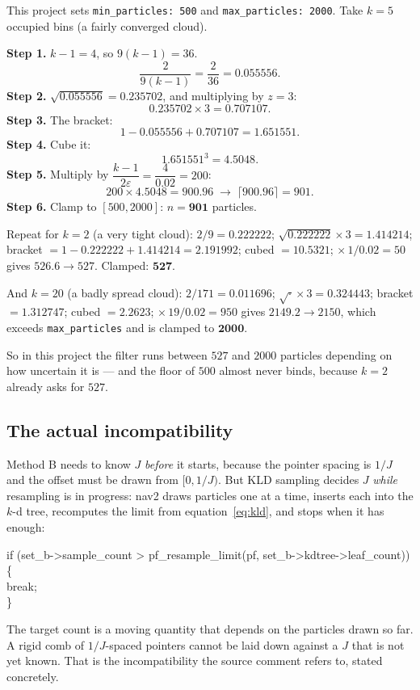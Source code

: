 \documentclass[11pt,a4paper]{report}
\newcommand{\file}[1]{\texttt{\small #1}}
\begin{document}
\begin{handbox}
This project sets \file{min\_particles: 500} and \file{max\_particles: 2000}.
Take $k = 5$ occupied bins (a fairly converged cloud).

\smallskip
\textbf{Step 1.} $k - 1 = 4$, so $9(k-1) = 36$.
\[
\frac{2}{9(k-1)} = \frac{2}{36} = 0.055556 .
\]
\textbf{Step 2.} $\sqrt{0.055556} = 0.235702$, and multiplying by $z = 3$:
\[
0.235702 \times 3 = 0.707107 .
\]
\textbf{Step 3.} The bracket:
\[
1 - 0.055556 + 0.707107 = 1.651551 .
\]
\textbf{Step 4.} Cube it:
\[
1.651551^{3} = 4.5048 .
\]
\textbf{Step 5.} Multiply by $\dfrac{k-1}{2\varepsilon} = \dfrac{4}{0.02} = 200$:
\[
200 \times 4.5048 = 900.96 \;\longrightarrow\; \lceil 900.96 \rceil = 901 .
\]
\textbf{Step 6.} Clamp to $[500, 2000]$: $n = \mathbf{901}$ particles.

\medskip
Repeat for $k = 2$ (a very tight cloud):
$2/9 = 0.222222$; $\sqrt{0.222222}\times 3 = 1.414214$;
bracket $= 1 - 0.222222 + 1.414214 = 2.191992$; cubed $= 10.5321$;
$\times\, 1/0.02 = 50$ gives $526.6 \rightarrow 527$. Clamped: $\mathbf{527}$.

\medskip
And $k = 20$ (a badly spread cloud):
$2/171 = 0.011696$; $\sqrt{\cdot}\times 3 = 0.324443$; bracket $= 1.312747$;
cubed $= 2.2623$; $\times\, 19/0.02 = 950$ gives $2149.2 \rightarrow 2150$,
which exceeds \file{max\_particles} and is clamped to $\mathbf{2000}$.

\medskip
So in this project the filter runs between $527$ and $2000$ particles
depending on how uncertain it is --- and the floor of $500$ almost never binds,
because $k = 2$ already asks for $527$.
\end{handbox}

\subsection{The actual incompatibility}

Method B needs to know $J$ \emph{before} it starts, because the pointer
spacing is $1/J$ and the offset must be drawn from $[0, 1/J)$. But KLD
sampling decides $J$ \emph{while} resampling is in progress: nav2 draws
particles one at a time, inserts each into the $k$-d tree, recomputes the
limit from equation~\eqref{eq:kld}, and stops when it has enough:
\begin{center}
\begin{minipage}{0.8\textwidth}
\begin{plain}
\ttfamily\footnotesize
if (set\_b->sample\_count > pf\_resample\_limit(pf, set\_b->kdtree->leaf\_count)) \{\\
\hspace*{1em}break;\\
\}
\end{plain}
\end{minipage}
\end{center}
The target count is a moving quantity that depends on the particles drawn so
far. A rigid comb of $1/J$-spaced pointers cannot be laid down against a $J$
that is not yet known. That is the incompatibility the source comment refers
to, stated concretely.
\end{document}
